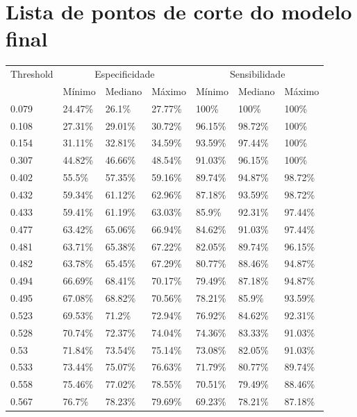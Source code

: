 \documentclass[a4paper,titlepage]{ppgi}\usepackage[]{graphicx}\usepackage[]{color}
\begin{document}
\chapter{Lista de pontos de corte do modelo final}
\label{apendice:lista-pontos-de-corte}



\begin{longtable}{l l l l l l l}
\centering
  Threshold & \multicolumn{3}{c}{Especificidade} & \multicolumn{3}{c}{Sensibilidade} \\ \cline{2-7}
            & \multicolumn{1}{|l}{Mínimo} & Mediano & Máximo & \multicolumn{1}{|l}{Mínimo} & Mediano & \multicolumn{1}{l|}{Máximo} \\
  \hline
  0.079 & 24.47\% & 26.1\% & 27.77\% & 100\% & 100\% & 100\% \\
0.108 & 27.31\% & 29.01\% & 30.72\% & 96.15\% & 98.72\% & 100\% \\
0.154 & 31.11\% & 32.81\% & 34.59\% & 93.59\% & 97.44\% & 100\% \\
0.307 & 44.82\% & 46.66\% & 48.54\% & 91.03\% & 96.15\% & 100\% \\
0.402 & 55.5\% & 57.35\% & 59.16\% & 89.74\% & 94.87\% & 98.72\% \\
0.432 & 59.34\% & 61.12\% & 62.96\% & 87.18\% & 93.59\% & 98.72\% \\
0.433 & 59.41\% & 61.19\% & 63.03\% & 85.9\% & 92.31\% & 97.44\% \\
0.477 & 63.42\% & 65.06\% & 66.94\% & 84.62\% & 91.03\% & 97.44\% \\
0.481 & 63.71\% & 65.38\% & 67.22\% & 82.05\% & 89.74\% & 96.15\% \\
0.482 & 63.78\% & 65.45\% & 67.29\% & 80.77\% & 88.46\% & 94.87\% \\
0.494 & 66.69\% & 68.41\% & 70.17\% & 79.49\% & 87.18\% & 94.87\% \\
0.495 & 67.08\% & 68.82\% & 70.56\% & 78.21\% & 85.9\% & 93.59\% \\
0.523 & 69.53\% & 71.2\% & 72.94\% & 76.92\% & 84.62\% & 92.31\% \\
0.528 & 70.74\% & 72.37\% & 74.04\% & 74.36\% & 83.33\% & 91.03\% \\
0.53 & 71.84\% & 73.54\% & 75.14\% & 73.08\% & 82.05\% & 91.03\% \\
0.533 & 73.44\% & 75.07\% & 76.63\% & 71.79\% & 80.77\% & 89.74\% \\
0.558 & 75.46\% & 77.02\% & 78.55\% & 70.51\% & 79.49\% & 88.46\% \\
0.567 & 76.7\% & 78.23\% & 79.69\% & 69.23\% & 78.21\% & 87.18\% \\

\end{longtable}
\end{document}
